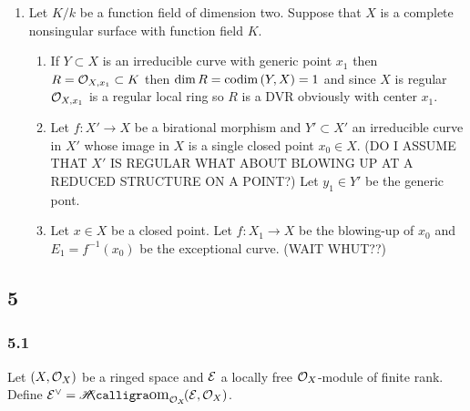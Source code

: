\documentclass[12pt]{article}
\begin{document}
\begin{enumerate}
\item Let $K/k$ be a function field of dimension two. Suppose that $X$ is a complete nonsingular surface with function field $K$.
\begin{enumerate}
\item If $Y \subset X$ is an irreducible curve with generic point $x_1$ then $R = \mathcal{O}_{X, x_1} \subset K$ then $\dim{R} = \mathrm{codim}\left( Y,X \right) = 1$ and since $X$ is regular $\mathcal{O}_{X, x_1}$ is a regular local ring so $R$ is a DVR obviously with center $x_1$.

\item Let $f : X' \to X$ be a birational morphism and $Y' \subset X'$ an irreducible curve in $X'$ whose image in $X$ is a single closed point $x_0 \in X$. (DO I ASSUME THAT $X'$ IS REGULAR WHAT ABOUT BLOWING UP AT A REDUCED STRUCTURE ON A POINT?) Let $y_1 \in Y'$ be the generic pont. 

\item Let $x \in X$ be a closed point. Let $f : X_1 \to X$ be the blowing-up of $x_0$ and $E_1 = f^{-1}(x_0)$ be the exceptional curve. (WAIT WHUT??)
\end{enumerate}
\end{enumerate}


\subsection{5}

\subsubsection{5.1}

Let $(X, \mathcal{O}_{X})$ be a ringed space and $\mathcal{E}$ a locally free $\mathcal{O}_{X}$-module of finite rank. Define $\E^\vee = \shHom{\struct{X}}{\E}{\struct{X}}$. 
\end{document}
